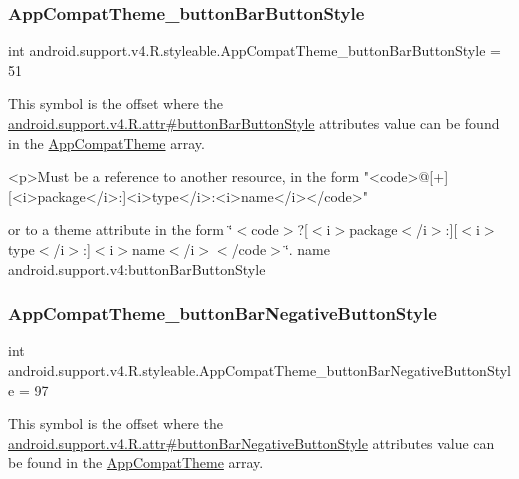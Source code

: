 \subsubsection{\texorpdfstring{App\+Compat\+Theme\+\_\+button\+Bar\+Button\+Style}{AppCompatTheme\_buttonBarButtonStyle}}
{\footnotesize\ttfamily int android.\+support.\+v4.\+R.\+styleable.\+App\+Compat\+Theme\+\_\+button\+Bar\+Button\+Style = 51\hspace{0.3cm}{\ttfamily [static]}}

This symbol is the offset where the \hyperlink{classandroid_1_1support_1_1v4_1_1R_1_1attr_a54c7f8bd105cdf2413596e8264b907c6}{android.\+support.\+v4.\+R.\+attr\#button\+Bar\+Button\+Style} attribute\textquotesingle{}s value can be found in the \hyperlink{classandroid_1_1support_1_1v4_1_1R_1_1styleable_ac07ebbe62ed977f6dcaadc6397840ace}{App\+Compat\+Theme} array.

\begin{DoxyVerb}      <p>Must be a reference to another resource, in the form "<code>@[+][<i>package</i>:]<i>type</i>:<i>name</i></code>"
\end{DoxyVerb}
 or to a theme attribute in the form \char`\"{}$<$code$>$?\mbox{[}$<$i$>$package$<$/i$>$\+:\mbox{]}\mbox{[}$<$i$>$type$<$/i$>$\+:\mbox{]}$<$i$>$name$<$/i$>$$<$/code$>$\char`\"{}.  name android.\+support.\+v4\+:button\+Bar\+Button\+Style \mbox{\label{classandroid_1_1support_1_1v4_1_1R_1_1styleable_a82c991e2fa9810fd845a9728c7cea014}} 
\subsubsection{\texorpdfstring{App\+Compat\+Theme\+\_\+button\+Bar\+Negative\+Button\+Style}{AppCompatTheme\_buttonBarNegativeButtonStyle}}
{\footnotesize\ttfamily int android.\+support.\+v4.\+R.\+styleable.\+App\+Compat\+Theme\+\_\+button\+Bar\+Negative\+Button\+Style = 97\hspace{0.3cm}{\ttfamily [static]}}

This symbol is the offset where the \hyperlink{classandroid_1_1support_1_1v4_1_1R_1_1attr_ab49f2526f5dcee871d94e0c224825433}{android.\+support.\+v4.\+R.\+attr\#button\+Bar\+Negative\+Button\+Style} attribute\textquotesingle{}s value can be found in the \hyperlink{classandroid_1_1support_1_1v4_1_1R_1_1styleable_ac07ebbe62ed977f6dcaadc6397840ace}{App\+Compat\+Theme} array.

